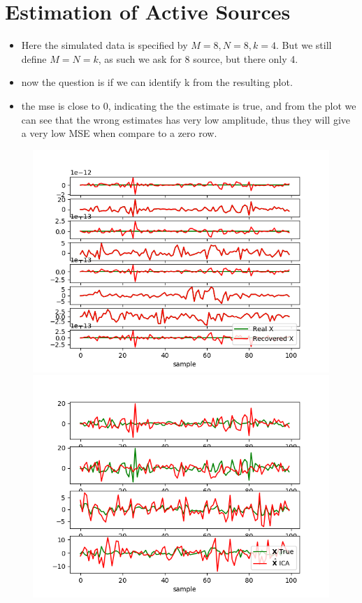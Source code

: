 \chapter{Estimation of Active Sources}
\begin{itemize}
\item Here the simulated data is specified by $M=8,N=8,k=4$. But we still define $M=N=k$, as such we ask for 8 source, but there only 4. 
\item now the question is if we can identify k from the resulting plot.  
\item the mse is close to 0, indicating the the estimate is true, and from the plot we can see that the wrong estimates has very low amplitude, thus they will give a very low MSE when compare to a zero row.
\end{itemize}

\begin{figure}[H]
    \begin{minipage}[t]{.45\textwidth}
		\centering
		\includegraphics[scale=0.5]{figures/ch_7/M=N_testk=4.png}
	\caption{}
	\label{fig:M=N_k=4}
    \end{minipage} 
    \hfill
    \begin{minipage}[t]{.45\textwidth}
		\centering
		\includegraphics[scale=0.5]{figures/ICAapp/ICA_app4.png}
	\caption{}
	\label{fig:}
    \end{minipage}
\end{figure}

